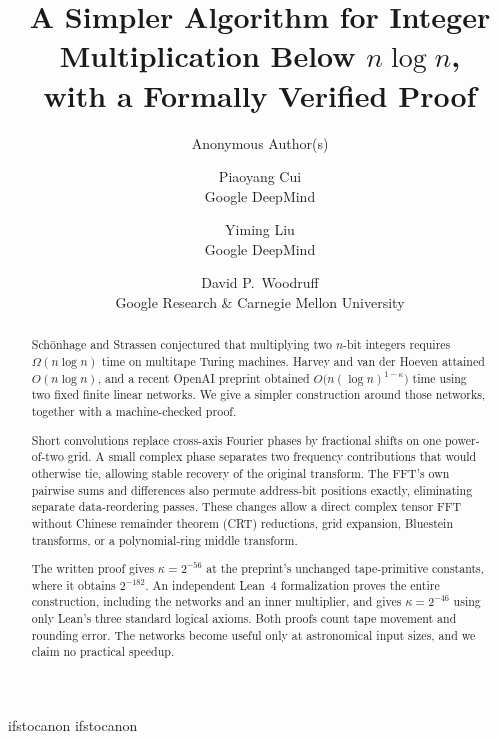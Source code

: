 \documentclass[11pt]{article}
\theoremstyle{definition}
\begin{document}
\title{A Simpler Algorithm for Integer Multiplication Below
\texorpdfstring{$n \log n$}{n log n},\\ with a Formally Verified Proof}
\ifcsname ifstocanon\endcsname\else
\expandafter\newif\csname ifstocanon\endcsname
\fi
\ifstocanon\author{Anonymous Author(s)}\else
\author{
Piaoyang Cui \\ {\small Google DeepMind} \and
Yiming Liu \\ {\small Google DeepMind} \and
David P.~Woodruff \\ {\small Google Research \& Carnegie Mellon University}
}
\fi
\date{}
\hypersetup{pageanchor=false}
\setcounter{page}{0}
\maketitle
\thispagestyle{empty}

\begin{abstract}
Sch\"onhage and Strassen conjectured that multiplying two $n$-bit integers requires $\Omega(n\log n)$ time on multitape Turing machines. Harvey and van der Hoeven attained $O(n\log n)$, and a recent OpenAI preprint obtained $O\bigl(n(\log n)^{1-\kappa}\bigr)$ time using two fixed finite linear networks. We give a simpler construction around those networks, together with a machine-checked proof.

Short convolutions replace cross-axis Fourier phases by fractional shifts on one power-of-two grid. A small complex phase separates two frequency contributions that would otherwise tie, allowing stable recovery of the original transform. The FFT's own pairwise sums and differences also permute address-bit positions exactly, eliminating separate data-reordering passes. These changes allow a direct complex tensor FFT without Chinese remainder theorem (CRT) reductions, grid expansion, Bluestein transforms, or a polynomial-ring middle transform.

The written proof gives $\kappa=2^{-56}$ at the preprint's unchanged tape-primitive constants, where it obtains $2^{-182}$. An independent Lean~4 formalization proves the entire construction, including the networks and an inner multiplier, and gives $\kappa=2^{-46}$ using only Lean's three standard logical axioms. Both proofs count tape movement and rounding error. The networks become useful only at astronomical input sizes, and we claim no practical speedup.
\end{abstract}

\clearpage
\hypersetup{pageanchor=true}
\pagestyle{pg}
\setcounter{page}{1}
\end{document}
